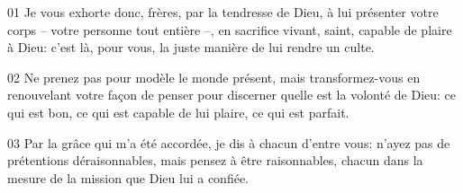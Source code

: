 01 Je vous exhorte donc, frères, par la tendresse de Dieu, à lui présenter votre corps – votre personne tout entière –, en sacrifice vivant, saint, capable de plaire à Dieu: c’est là, pour vous, la juste manière de lui rendre un culte.

02 Ne prenez pas pour modèle le monde présent, mais transformez-vous en renouvelant votre façon de penser pour discerner quelle est la volonté de Dieu: ce qui est bon, ce qui est capable de lui plaire, ce qui est parfait.

03 Par la grâce qui m’a été accordée, je dis à chacun d’entre vous: n’ayez pas de prétentions déraisonnables, mais pensez à être raisonnables, chacun dans la mesure de la mission que Dieu lui a confiée.
